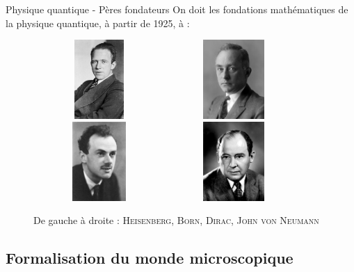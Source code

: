 \documentclass[11pt, xcolor=table]{beamer}
\begin{document}
\begin{frame}{Physique quantique - Pères fondateurs}
    On doit les fondations mathématiques de la physique quantique, à partir de 1925, à :
    \begin{figure}
        \centering
        \includegraphics[height=3cm, width=5cm, keepaspectratio]{Images/Heisenberg}
        \includegraphics[height=3cm, width=5cm, keepaspectratio]{Images/Born}
        \includegraphics[height=3cm, width=5cm, keepaspectratio]{Images/Dirac}
        \includegraphics[height=3cm, width=5cm, keepaspectratio]{Images/JohnvonNeumann}
        \caption{De gauche à droite : \textsc{Heisenberg}, \textsc{Born}, \textsc{Dirac}, \textsc{John von Neumann}}
    \end{figure}

\end{frame}

\subsection{Formalisation du monde microscopique}
\end{document}
